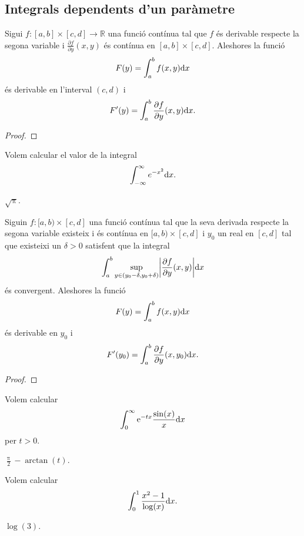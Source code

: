 \documentclass[../Apunts.tex]{subfiles}
\begin{document}
	\subsection{Integrals dependents d'un paràmetre}
	\begin{theorem}
		\label{thm:criteri per la derivació sota el signe de la integral}
		Sigui \(f\colon[a,b]\times[c,d]\longrightarrow\mathbb{R}\) una funció contínua tal que \(f\) és derivable respecte la segona variable i \(\frac{\partial f}{\partial y}(x,y)\) és contínua en \([a,b]\times[c,d]\). Aleshores la funció
		\[F(y)=\int_{a}^{b}f(x,y)\mathrm{d} x\]
		és derivable en l'interval \((c,d)\) i
		\[F'(y)=\int_{a}^{b}\frac{\partial f}{\partial y}(x,y)\mathrm{d} x.\]
		\begin{proof}
		\end{proof}
	\end{theorem}
	\begin{example}
		\label{ex:integral de Gauss}
		Volem calcular el valor de la integral
		\[\int_{-\infty}^{\infty}e^{-x^{2}}\mathrm{d} x.\] %
		\begin{solution}
			\(\sqrt{\uppi}\).
		\end{solution}
	\end{example}
	\begin{theorem}
		\label{thm:criteri per la derivabilitat sota el signe de la integral}
		Siguin \(f\colon[a,b)\times[c,d]\) una funció contínua tal que la seva derivada respecte la segona variable existeix i és contínua en \([a,b)\times[c,d]\) i \(y_{0}\) un real en \([c,d]\) tal que existeixi un \(\delta>0\) satisfent que la integral
		\[\int_{a}^{b}\sup_{y\in(y_{0}-\delta,y_{0}+\delta)}\abs{\frac{\partial f}{\partial y}(x,y)}\diff x\]
		és convergent. Aleshores la funció
		\[F(y)=\int_{a}^{b}f(x,y)\mathrm{d} x\]
		és derivable en \(y_{0}\) i
		\[F'(y_{0})=\int_{a}^{b}\frac{\partial f}{\partial y}(x,y_{0})\mathrm{d} x.\]
		\begin{proof}
		\end{proof}
	\end{theorem}
	\begin{example}
		\label{ex:trobar una funció derivant sota el signe de la integral}
		Volem calcular
		\[\int_{0}^{\infty}\mathrm{e}^{-tx}\frac{\sin(x)}{x}\mathrm{d} x\]
		per \(t>0\).
		\begin{solution}
			\(\frac{\uppi}{2}-\arctan(t)\). %
		\end{solution}
	\end{example}
	\begin{example}
		\label{ex:trobar un valor derivant sota el signe de la integral inventant-se una funció}
		Volem calcular
		\[\int_{0}^{1}\frac{x^{2}-1}{\log(x)}\mathrm{d} x.\]
		\begin{solution}
			\(\log(3)\). %
		\end{solution}
	\end{example}
\end{document}
